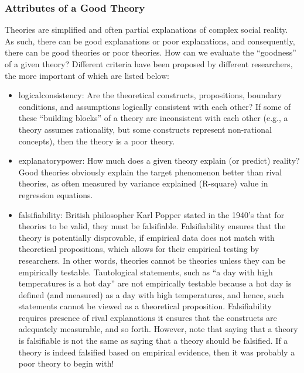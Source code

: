 \subsubsection{Attributes of a Good Theory}

Theories are simplified and often partial explanations of complex social reality. As such, there can be good explanations or poor explanations, and consequently, there can be good theories or poor theories. How can we evaluate the ``goodness'' of a given theory? Different criteria have been proposed by different researchers, the more important of which are listed below:

\begin{itemize}

	\item \Gls{logicalconsistency}: Are the theoretical constructs, propositions, boundary conditions, and assumptions logically consistent with each other? If some of these ``building blocks'' of a theory are inconsistent with each other (e.g., a theory assumes rationality, but some constructs represent non-rational concepts), then the theory is a poor theory.

	\item \Gls{explanatorypower}: How much does a given theory explain (or predict) reality? Good theories obviously explain the target phenomenon better than rival theories, as often measured by variance explained (R-square) value in regression equations.

	\item \Gls{falsifiability}: British philosopher Karl Popper stated in the 1940's that for theories to be valid, they must be falsifiable. Falsifiability ensures that the theory is potentially disprovable, if empirical data does not match with theoretical propositions, which allows for their empirical testing by researchers. In other words, theories cannot be theories unless they can be empirically testable. Tautological statements, such as ``a day with high temperatures is a hot day'' are not empirically testable because a hot day is defined (and measured) as a day with high temperatures, and hence, such statements cannot be viewed as a theoretical proposition. Falsifiability requires presence of rival explanations it ensures that the constructs are adequately measurable, and so forth. However, note that saying that a theory is falsifiable is not the same as saying that a theory should be falsified. If a theory is indeed falsified based on empirical evidence, then it was probably a poor theory to begin with!


\end{itemize}
